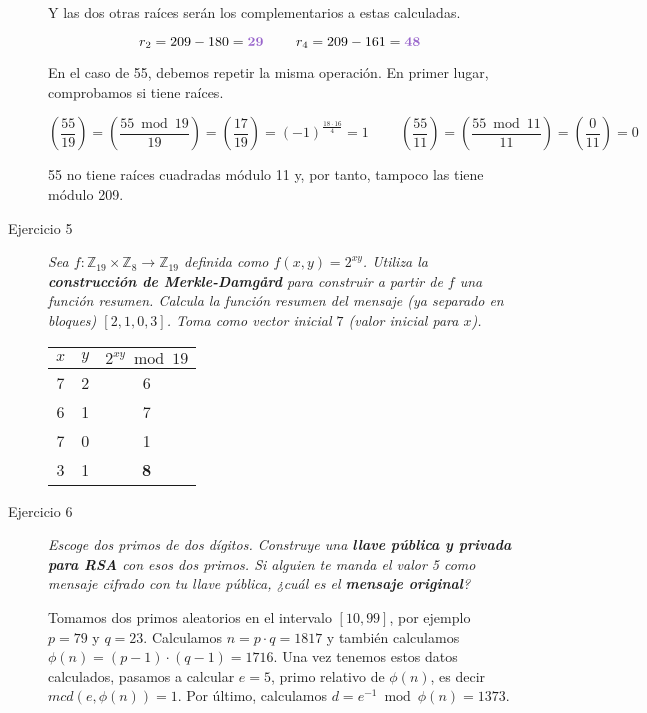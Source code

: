 \documentclass[10pt,spanish]{article}
\begin{document}
\begin{description}
    Y las dos otras raíces serán los complementarios a estas calculadas.

    \begin{displaymath}
        r_2 = 209 - 180 =  \textcolor{morado}{\mathbf{29}} \qquad\ r_4 = 209 - 161 = \mathbf{\textcolor{morado}{48}}
    \end{displaymath}

    En el caso de 55, debemos repetir la misma operación. En primer lugar, comprobamos si tiene raíces.

    \begin{displaymath}
        \left(\frac{55}{19} \right) = \left(\frac{55 \bmod 19}{19} \right) = \left(\frac{17}{19} \right) = (-1)^\frac{18 \cdot 16}{4} = 1 \qquad\ \left(\frac{55}{11} \right) = \left(\frac{55 \bmod 11}{11} \right) = \left(\frac{0}{11} \right) = 0
    \end{displaymath}

    55 no tiene raíces cuadradas módulo 11 y, por tanto, tampoco las tiene módulo 209.

    \item[Ejercicio 5] \textit{Sea $f: \mathbb{Z}_{19} \times \mathbb{Z}_8 \rightarrow \mathbb{Z}_{19}$ definida como $f(x,y) = 2^{xy}$. Utiliza la \textbf{\textcolor{morado}{construcción de Merkle-Damgård}} para construir a partir de $f$ una función resumen. Calcula la función resumen del mensaje (ya separado en bloques) $[2,1,0,3]$. Toma como vector inicial $7$ (valor inicial para $x$).}

    \begin{center}
        \begin{tabular}{c | c | c}
        $x$ & $y$ & $2^{xy} \bmod 19$ \\
        \hline
        7 & 2 & 6 \\
        6 & 1 & 7 \\
        7 & 0 & 1 \\
        3 & 1 & \textcolor{morado}{\textbf{8}}
        \end{tabular}
    \end{center}

    \item[Ejercicio 6] \textit{Escoge dos primos de dos dígitos. Construye una \textbf{\textcolor{morado}{llave pública y privada para RSA}} con esos dos primos. Si alguien te manda el valor 5 como mensaje cifrado con tu llave pública, ¿cuál es el \textbf{\textcolor{morado}{mensaje original}}?}

    Tomamos dos primos aleatorios en el intervalo $[10,99]$, por ejemplo $p = 79$ y $q = 23$. Calculamos $n = p\cdot q = 1817$ y también calculamos $\phi (n) = (p-1) \cdot (q-1) = 1716$. Una vez tenemos estos datos calculados, pasamos a calcular $e = 5$, primo relativo de $\phi (n)$, es decir $mcd (e, \phi(n)) = 1$. Por último, calculamos $d = e^{-1} \bmod \phi(n) = 1373$.


\end{description}
\end{document}
